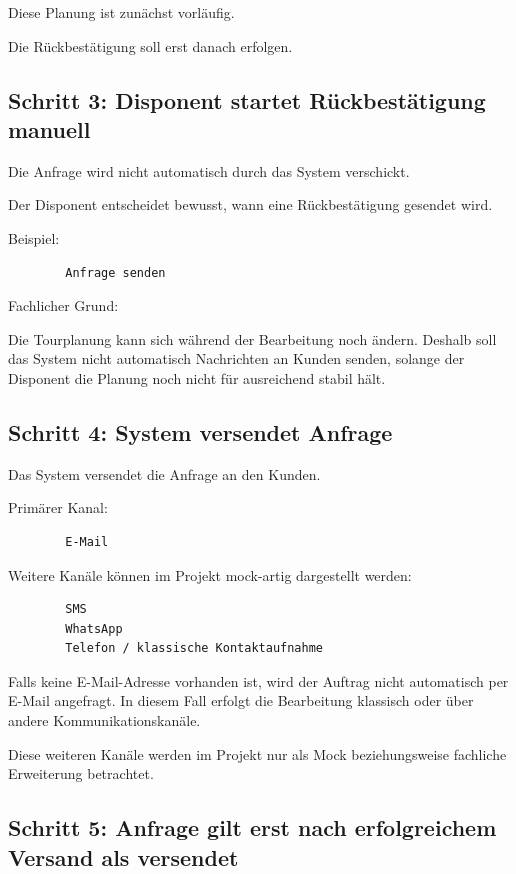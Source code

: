 \documentclass[12pt,a4paper]{article}
\begin{document}
	Diese Planung ist zunächst vorläufig.
	
	Die Rückbestätigung soll erst danach erfolgen.
	
	\subsection{Schritt 3: Disponent startet Rückbestätigung manuell}
	
	Die Anfrage wird nicht automatisch durch das System verschickt.
	
	Der Disponent entscheidet bewusst, wann eine Rückbestätigung gesendet wird.
	
	Beispiel:
	
	\begin{lstlisting}
		Anfrage senden
	\end{lstlisting}
	
	Fachlicher Grund:
	
	Die Tourplanung kann sich während der Bearbeitung noch ändern. Deshalb soll das System nicht automatisch Nachrichten an Kunden senden, solange der Disponent die Planung noch nicht für ausreichend stabil hält.
	
	\subsection{Schritt 4: System versendet Anfrage}
	
	Das System versendet die Anfrage an den Kunden.
	
	Primärer Kanal:
	
	\begin{lstlisting}
		E-Mail
	\end{lstlisting}
	
	Weitere Kanäle können im Projekt mock-artig dargestellt werden:
	
	\begin{lstlisting}
		SMS
		WhatsApp
		Telefon / klassische Kontaktaufnahme
	\end{lstlisting}
	
	Falls keine E-Mail-Adresse vorhanden ist, wird der Auftrag nicht automatisch per E-Mail angefragt. In diesem Fall erfolgt die Bearbeitung klassisch oder über andere Kommunikationskanäle.
	
	Diese weiteren Kanäle werden im Projekt nur als Mock beziehungsweise fachliche Erweiterung betrachtet.
	
	\subsection{Schritt 5: Anfrage gilt erst nach erfolgreichem Versand als versendet}
	
\end{document}

